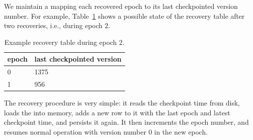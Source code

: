 We maintain a  mapping each recovered epoch to its last checkpointed version number. 
For example, Table~\ref{table:recovery} shows a possible state of the recovery table after two recoveries, i.e., during epoch $2$. 

\begin{table}[h]
\begin{center}
\begin{tabular}{ll}
epoch & last checkpointed version \\
\hline
0 & 1375\\
1 &  956\\
\end{tabular}
\end{center}
\caption{Example recovery table during epoch $2$.}
\label{table:recovery}
\end{table} 
 
The recovery procedure is very simple: it reads the checkpoint time from disk, loads the  into memory, adds a new row to it with the last epoch and latest checkpoint time, and persists it again. It then increments the epoch number, and resumes normal operation with version number $0$ in the new epoch.












